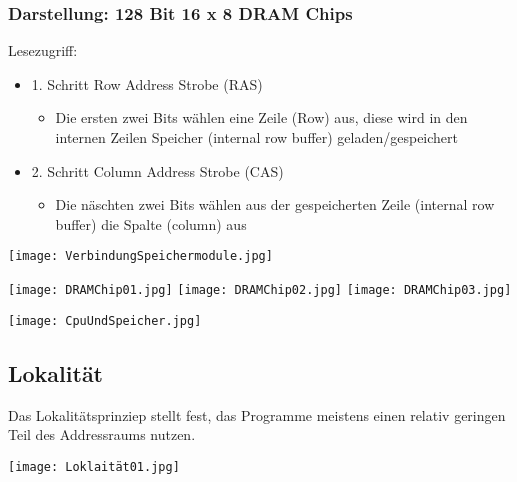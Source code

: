 		\subsubsection{Darstellung: 128 Bit 16 x 8 DRAM Chips}
			\begin{minipage}{0.5\textwidth}
				Lesezugriff:
				\begin{itemize}
					\item 1. Schritt Row Address Strobe (RAS)
						\begin{itemize}
							\item Die ersten zwei Bits wählen eine Zeile (Row) aus, diese wird 
								in den internen Zeilen Speicher (internal row buffer) geladen/gespeichert
						\end{itemize}
					\item 2. Schritt Column Address Strobe (CAS)
						\begin{itemize}
							\item Die näschten zwei Bits wählen aus der gespeicherten Zeile (internal row buffer)
								die Spalte (column) aus
						\end{itemize}
				\end{itemize}
				\centerline{\texttt{[image: VerbindungSpeichermodule.jpg]}}
			\end{minipage}
			\begin{minipage}{0.45\textwidth}
				\begin{center}
					\texttt{[image: DRAMChip01.jpg]}
					\texttt{[image: DRAMChip02.jpg]}
					\texttt{[image: DRAMChip03.jpg]}
				\end{center}
			\end{minipage}

			\centerline{\texttt{[image: CpuUndSpeicher.jpg]}}


	\subsection{Lokalität}
		\begin{minipage}{0.5\textwidth}
			Das Lokalitätsprinziep stellt fest, das Programme meistens einen relativ geringen Teil des Addressraums nutzen.
		\end{minipage}
		\begin{minipage}{0.45\textwidth}
			\begin{center}
				\texttt{[image: Loklaität01.jpg]}
			\end{center}
		\end{minipage}

